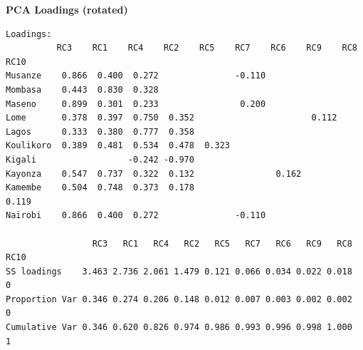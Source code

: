 \documentclass[12pt,a4paper]{article}
\begin{document}
\textbf{PCA Loadings (rotated)}
\begin{verbatim}
Loadings:
          RC3    RC1    RC4    RC2    RC5    RC7    RC6    RC9    RC8    RC10  
Musanze    0.866  0.400  0.272               -0.110                            
Mombasa    0.443  0.830  0.328                                                 
Maseno     0.899  0.301  0.233                0.200                            
Lome       0.378  0.397  0.750  0.352                       0.112              
Lagos      0.333  0.380  0.777  0.358                                          
Koulikoro  0.389  0.481  0.534  0.478  0.323                                   
Kigali                  -0.242 -0.970                                          
Kayonza    0.547  0.737  0.322  0.132                0.162                     
Kamembe    0.504  0.748  0.373  0.178                              0.119       
Nairobi    0.866  0.400  0.272               -0.110                            

                 RC3   RC1   RC4   RC2   RC5   RC7   RC6   RC9   RC8 RC10
SS loadings    3.463 2.736 2.061 1.479 0.121 0.066 0.034 0.022 0.018    0
Proportion Var 0.346 0.274 0.206 0.148 0.012 0.007 0.003 0.002 0.002    0
Cumulative Var 0.346 0.620 0.826 0.974 0.986 0.993 0.996 0.998 1.000    1
\end{verbatim}
\end{document}
